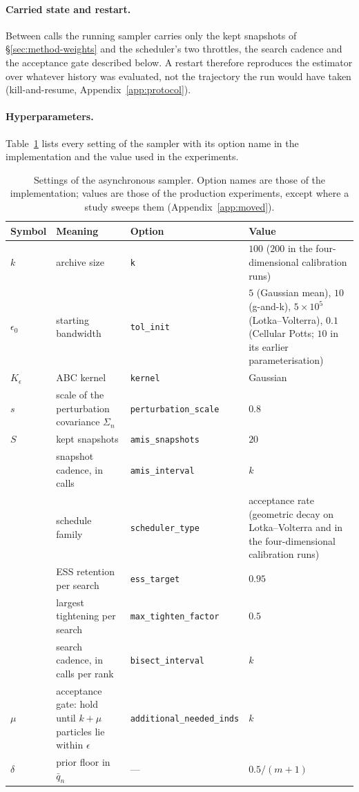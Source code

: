 \documentclass[10pt]{article}
\theoremstyle{plain}
\theoremstyle{definition}
\begin{document}
\paragraph{Carried state and restart.} Between calls the running sampler carries only the kept snapshots of \S\ref{sec:method-weights} and the scheduler's two throttles, the search cadence and the acceptance gate described below. A restart therefore reproduces the estimator over whatever history was evaluated, not the trajectory the run would have taken (kill-and-resume, Appendix~\ref{app:protocol}).

\paragraph{Hyperparameters.} Table~\ref{tab:hyperparameters} lists every setting of the sampler with its option name in the implementation and the value used in the experiments.
\begin{table}[h]
\caption{Settings of the asynchronous sampler. Option names are those of the implementation; values are those of the production experiments, except where a study sweeps them (Appendix~\ref{app:moved}).}\label{tab:hyperparameters}
\centering
\footnotesize
\begin{tabular}{@{}>{\raggedright\arraybackslash}p{}>{\raggedright\arraybackslash}p{}>{\raggedright\arraybackslash}p{}>{\raggedright\arraybackslash}p{}@{}}
\toprule
Symbol & Meaning & Option & Value \\
\midrule
$k$ & archive size & \texttt{k} & $100$ ($200$ in the four-dimensional calibration runs) \\
$\epsilon_0$ & starting bandwidth & \texttt{tol\_init} & $5$ (Gaussian mean), $10$ (g-and-k), $5\times10^{5}$ (Lotka--Volterra), $0.1$ (Cellular Potts; $10$ in its earlier parameterisation) \\
$K_\epsilon$ & ABC kernel & \texttt{kernel} & Gaussian \\
$s$ & scale of the perturbation covariance $\Sigma_n$ & \texttt{perturbation\_scale} & $0.8$ \\
$S$ & kept snapshots & \texttt{amis\_snapshots} & $20$ \\
 & snapshot cadence, in calls & \texttt{amis\_interval} & $k$ \\
 & schedule family & \texttt{scheduler\_type} & acceptance rate (geometric decay on Lotka--Volterra and in the four-dimensional calibration runs) \\
 & ESS retention per search & \texttt{ess\_target} & $0.95$ \\
 & largest tightening per search & \texttt{max\_tighten\_factor} & $0.5$ \\
 & search cadence, in calls per rank & \texttt{bisect\_interval} & $k$ \\
$\mu$ & acceptance gate: hold until $k+\mu$ particles lie within $\epsilon$ & \texttt{additional\_needed\_inds} & $k$ \\
$\delta$ & prior floor in $\bar q_n$ & --- & $0.5/(m{+}1)$ \\
\bottomrule
\end{tabular}
\end{table}
\end{document}
